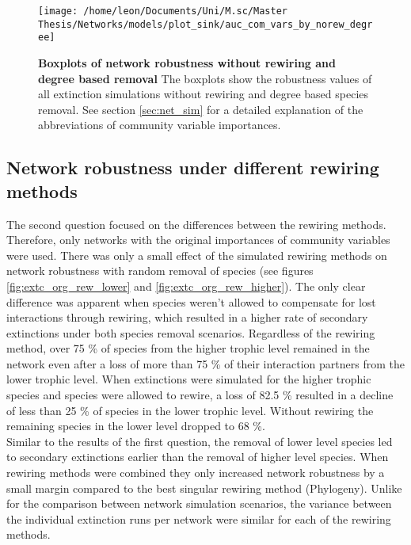 \documentclass[12pt,a4paper]{article}
\begin{document}
\begin{figure}[H]
	 \centering
	 \texttt{[image: /home/leon/Documents/Uni/M.sc/Master Thesis/Networks/models/plot\_sink/auc\_com\_vars\_by\_norew\_degree]}
	 \captionsetup{width = \textwidth}
	 \caption[Boxplots of network robustness without rewiring and degree based removal]{\textbf{Boxplots of network robustness without rewiring and degree based removal} The boxplots show the robustness values of all extinction simulations without rewiring and degree based species removal. See section \ref{sec:net_sim} for a detailed explanation of the abbreviations of community variable importances.}
	 \label{fig:auc_cv_norew_deg}
\end{figure}


\subsection{Network robustness under different rewiring methods}


The second question focused on the differences between the rewiring methods. Therefore, only networks with the original importances of community variables were used. There was only a small effect of the simulated rewiring methods on network robustness with random removal of species (see figures \ref{fig:extc_org_rew_lower} and \ref{fig:extc_org_rew_higher}). The only clear difference was apparent when species weren't allowed to compensate for lost interactions through rewiring, which resulted in a higher rate of secondary extinctions under both species removal scenarios.
Regardless of the rewiring method, over 75 \% of species from the higher trophic level remained in the network even after a loss of more than 75 \% of their interaction partners from the lower trophic level. When extinctions were simulated for the higher trophic species and species were allowed to rewire, a loss of 82.5 \% resulted in a decline of less than 25 \% of species in the lower trophic level. Without rewiring the remaining species in the lower level dropped to 68 \%.\\ Similar to the results of the first question, the removal of lower level species led to secondary extinctions earlier than the removal of higher level species. When rewiring methods were combined they only increased network robustness by a small margin compared to the best singular rewiring method (Phylogeny). Unlike for the comparison between network simulation scenarios, the variance between the individual extinction runs per network were similar for each of the rewiring methods. 
\end{document}
